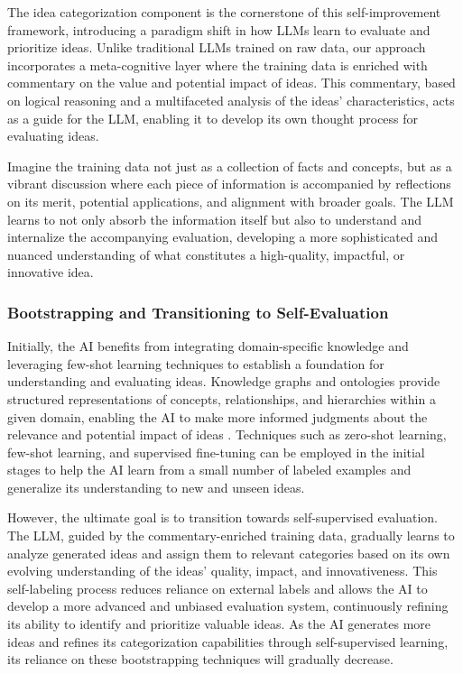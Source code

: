 \documentclass[conference]{article}
\begin{document}
	The idea categorization component is the cornerstone of this self-improvement framework, introducing a paradigm shift in how LLMs learn to evaluate and prioritize ideas. Unlike traditional LLMs trained on raw data, our approach incorporates a meta-cognitive layer where the training data is enriched with commentary on the value and potential impact of ideas. This commentary, based on logical reasoning and a multifaceted analysis of the ideas' characteristics, acts as a guide for the LLM, enabling it to develop its own thought process for evaluating ideas.
	
	Imagine the training data not just as a collection of facts and concepts, but as a vibrant discussion where each piece of information is accompanied by reflections on its merit, potential applications, and alignment with broader goals. The LLM learns to not only absorb the information itself but also to understand and internalize the accompanying evaluation, developing a more sophisticated and nuanced understanding of what constitutes a high-quality, impactful, or innovative idea.
	
	\subsubsection{Bootstrapping and Transitioning to Self-Evaluation}
	
	Initially, the AI benefits from integrating domain-specific knowledge and leveraging few-shot learning techniques to establish a foundation for understanding and evaluating ideas. Knowledge graphs \cite{ji2021survey} and ontologies \cite{guarino1998formal} provide structured representations of concepts, relationships, and hierarchies within a given domain, enabling the AI to make more informed judgments about the relevance and potential impact of ideas \cite{benedek2012creativity}. Techniques such as zero-shot learning, few-shot learning, and supervised fine-tuning \cite{brown2020language, schick2021exploiting} can be employed in the initial stages to help the AI learn from a small number of labeled examples and generalize its understanding to new and unseen ideas.
	
	However, the ultimate goal is to transition towards self-supervised evaluation. The LLM, guided by the commentary-enriched training data, gradually learns to analyze generated ideas and assign them to relevant categories based on its own evolving understanding of the ideas' quality, impact, and innovativeness. This self-labeling process reduces reliance on external labels and allows the AI to develop a more advanced and unbiased evaluation system, continuously refining its ability to identify and prioritize valuable ideas. As the AI generates more ideas and refines its categorization capabilities through self-supervised learning, its reliance on these bootstrapping techniques will gradually decrease.
	
\end{document}
